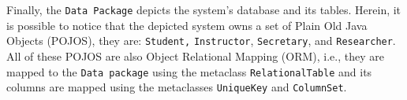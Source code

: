 Finally, the \texttt{Data Package} depicts the system's database and its tables. Herein, it is possible to notice that the depicted system owns a set of Plain Old Java Objects (POJOS), they are: \texttt{Student,} \texttt{Instructor}, \texttt{Secretary}, and \texttt{Researcher}. All of these POJOS are also Object Relational Mapping (ORM), i.e., they are mapped to the \texttt{Data package} using the metaclass \texttt{RelationalTable} and its columns are mapped using the metaclasses \texttt{UniqueKey} and \texttt{ColumnSet}.

%
%
%



